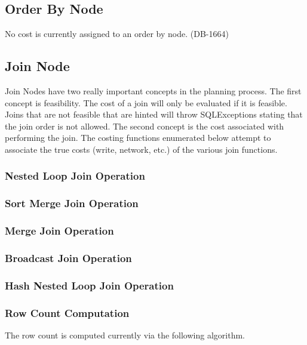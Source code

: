      


\subsection{Order By Node}

No cost is currently assigned to an order by node. (DB-1664)  

\subsection{Join Node}

Join Nodes have two really important concepts in the planning process.  The
first concept is feasibility.  The cost of a join will only be evaluated if it
is feasible.  Joins that are not feasible that are hinted will throw
SQLExceptions stating that the join order is not allowed.  The second concept is
the cost associated with performing the join.  The costing functions enumerated
below attempt to associate the true costs (write, network, etc.) of the various
join functions.

\subsubsection{Nested Loop Join Operation}


\subsubsection{Sort Merge Join Operation}

\subsubsection{Merge Join Operation}

\subsubsection{Broadcast Join Operation}

\subsubsection{Hash Nested Loop Join Operation}


\subsubsection{Row Count Computation}

The row count is computed currently via the following algorithm.

